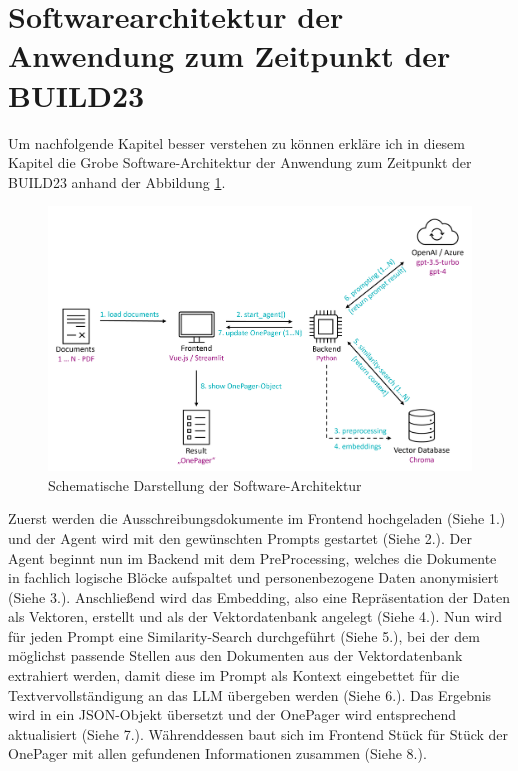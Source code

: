 \section{Softwarearchitektur der Anwendung zum Zeitpunkt der BUILD23}
Um nachfolgende Kapitel besser verstehen zu können erkläre ich in diesem Kapitel die Grobe Software-Architektur der
Anwendung zum Zeitpunkt der BUILD23 anhand der Abbildung \ref{fig:DokumentenAgent-uebersicht}.

\begin{figure}[h]
    \centering
    \includegraphics[width=1\textwidth]{figures/DokumentenAgent-Uebersicht.png}
    \caption{Schematische Darstellung der Software-Architektur}
    \label{fig:DokumentenAgent-uebersicht}    %
\end{figure}

Zuerst werden die Ausschreibungsdokumente im Frontend hochgeladen (Siehe 1.) und der Agent wird mit den gewünschten
Prompts gestartet (Siehe 2.). Der Agent beginnt nun im Backend mit dem PreProcessing, welches die Dokumente in fachlich
logische Blöcke aufspaltet und personenbezogene Daten anonymisiert (Siehe 3.). Anschließend wird das Embedding, also
eine Repräsentation der Daten als Vektoren, erstellt und als der Vektordatenbank angelegt (Siehe 4.). Nun wird für jeden
Prompt eine Similarity-Search durchgeführt (Siehe 5.), bei der dem möglichst passende Stellen aus den Dokumenten aus der
Vektordatenbank extrahiert werden, damit diese im Prompt als Kontext eingebettet für die Textvervollständigung an das
LLM übergeben werden (Siehe 6.). Das Ergebnis wird in ein JSON-Objekt übersetzt und der OnePager wird entsprechend
aktualisiert (Siehe 7.). Währenddessen baut sich im Frontend Stück für Stück der OnePager mit allen gefundenen
Informationen zusammen (Siehe 8.).

